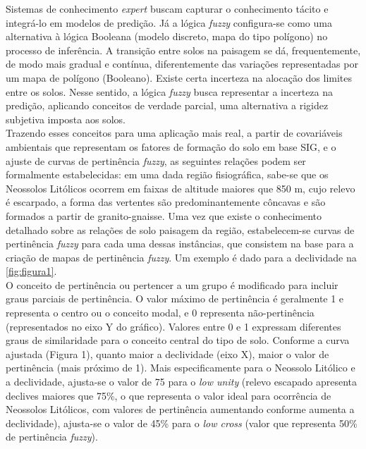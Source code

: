 Sistemas de conhecimento \emph{expert} buscam capturar o conhecimento tácito e integrá-lo em modelos de predição. Já a lógica \emph{fuzzy} configura-se como uma alternativa à lógica Booleana (modelo discreto, mapa do tipo polígono) no processo de inferência. A transição entre solos na paisagem se dá, frequentemente, de modo mais gradual e contínua, diferentemente das variações representadas por um mapa de polígono (Booleano). Existe certa incerteza na alocação dos limites entre os solos. Nesse sentido, a lógica \emph{fuzzy} busca representar a incerteza na predição, aplicando conceitos de verdade parcial, uma alternativa a rigidez subjetiva imposta aos solos.\\
Trazendo esses conceitos para uma aplicação mais real, a partir de covariáveis ambientais que representam os fatores de formação do solo em base SIG, e o ajuste de curvas de pertinência \emph{fuzzy}, as seguintes relações podem ser formalmente estabelecidas: em uma dada região fisiográfica, sabe-se que os Neossolos Litólicos ocorrem em faixas de altitude maiores que 850 m, cujo relevo é escarpado, a forma das vertentes são predominantemente côncavas e são formados a partir de granito-gnaisse. Uma vez que existe o conhecimento detalhado sobre as relações de solo paisagem da região, estabelecem-se curvas de pertinência \emph{fuzzy} para cada uma dessas instâncias, que consistem na base para a criação de mapas de pertinência \emph{fuzzy}. Um exemplo é dado para a declividade na \ref{fig:figura1}.\\
O conceito de pertinência ou pertencer a um grupo é modificado para incluir graus parciais de pertinência. O valor máximo de pertinência é geralmente 1 e representa o centro ou o conceito modal, e 0 representa não-pertinência (representados no eixo Y do gráfico). Valores entre 0 e 1 expressam diferentes graus de similaridade para o conceito central do tipo de solo. Conforme a curva ajustada (Figura 1), quanto maior a declividade (eixo X), maior o valor de pertinência (mais próximo de 1). Mais especificamente para o Neossolo Litólico e a declividade, ajusta-se o valor de 75 para o \emph{low unity} (relevo escapado apresenta declives maiores que 75\%, o que representa o valor ideal para ocorrência de Neossolos Litólicos, com valores de pertinência aumentando conforme aumenta a declividade), ajusta-se o valor de 45\% para o \emph{low cross} (valor que representa 50\% de pertinência \emph{fuzzy}).\\
